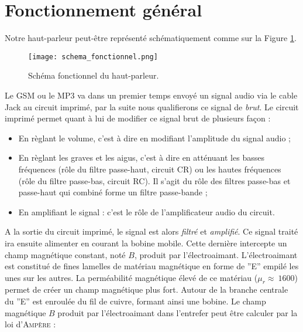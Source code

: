 

\section{Fonctionnement général}
Notre haut-parleur peut-être représenté schématiquement comme sur la Figure \ref{block-diagram-hp}.

\begin{figure}[!htb]
	\centering
	\texttt{[image: schema\_fonctionnel.png]}
	\caption{Schéma fonctionnel du haut-parleur.}
	\label{block-diagram-hp}
\end{figure}

Le GSM ou le MP3 va dans un premier temps envoyé un signal audio via le cable Jack au circuit
imprimé, par la suite nous qualifierons ce signal de \textit{brut}. Le circuit imprimé permet
quant à lui de modifier ce signal brut de plusieurs façon : 

\begin{itemize}
	\item En règlant le volume, c'est à dire en modifiant l'amplitude du signal audio ;
	\item En règlant les graves et les aigus, c'est à dire en atténuant les basses fréquences
	(rôle du filtre passe-haut, circuit CR) ou les hautes
	fréquences (rôle du filtre passe-bas, circuit RC). Il s'agit du rôle des filtres passe-bas 
	et passe-haut qui combiné forme un filtre passe-bande ;
	\item En amplifiant le signal : c'est le rôle de l'amplificateur audio du circuit.
\end{itemize}

A la sortie du circuit imprimé, le signal est alors \textit{filtré} et \textit{amplifié}.
Ce signal traité ira ensuite alimenter en courant la bobine mobile. Cette 
dernière intercepte un champ magnétique constant, noté $B$, produit par l'électroaimant.
L'électroaimant est constitué de fines lamelles de matériau magnétique en forme de ''E'' 
empilé les unes sur les autres. La perméabilité magnétique élevé de ce matériau
($\mu_r \approx \ 1600$) permet de créer un champ magnétique plus fort. Autour de la branche
centrale du ''E'' est enroulée du fil de cuivre, formant ainsi une bobine.
Le champ magnétique $B$ produit par l'électroaimant dans l'entrefer peut être calculer par la 
loi d'\textsc{Ampère} :

